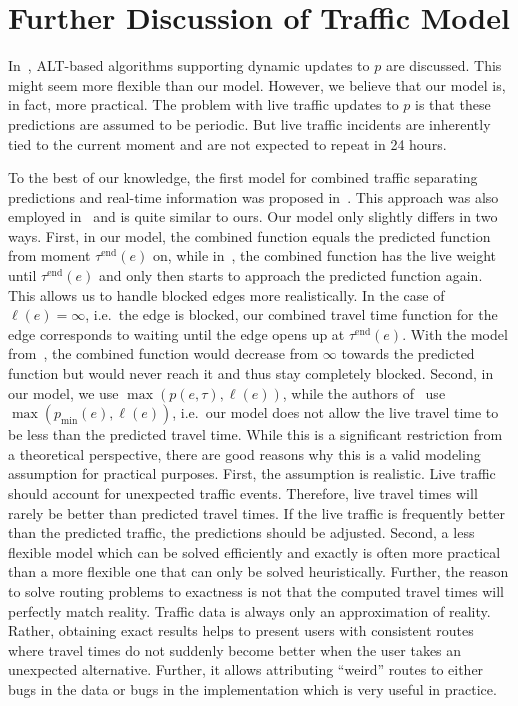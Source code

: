 \documentclass[a4paper,UKenglish,cleveref, autoref, thm-restate]{lipics-v2021}
\newcommand*{\pred}{p}
\newcommand*{\live}{\ell}
\newcommand*{\tend}{\tau^{\operatorname{end}}}
\begin{document}




\appendix

\section{Further Discussion of Traffic Model}\label{sec:appendix:model}

In~\cite{dn-crdtd-12}, ALT-based algorithms supporting dynamic updates to $\pred$ are discussed.
This might seem more flexible than our model.
However, we believe that our model is, in fact, more practical.
The problem with live traffic updates to $\pred$ is that these predictions are assumed to be periodic.
But live traffic incidents are inherently tied to the current moment and are not expected to repeat in 24 hours.

To the best of our knowledge, the first model for combined traffic separating predictions and real-time information was proposed in~\cite{strasser:OASIcs:2017:7897}.
This approach was also employed in~\cite{strasser_et_al:LIPIcs.SEA.2021.6} and is quite similar to ours.
Our model only slightly differs in two ways.
First, in our model, the combined function equals the predicted function from moment $\tend(e)$ on, while in~\cite{strasser:OASIcs:2017:7897}, the combined function has the live weight until $\tend(e)$ and only then starts to approach the predicted function again.
This allows us to handle blocked edges more realistically.
In the case of $\live(e) = \infty$, i.e.\ the edge is blocked, our combined travel time function for the edge corresponds to waiting until the edge opens up at $\tend(e)$.
With the model from~\cite{strasser:OASIcs:2017:7897}, the combined function would decrease from $\infty$ towards the predicted function but would never reach it and thus stay completely blocked.
Second, in our model, we use $\max(\pred(e, \tau), \live(e))$, while the authors of~\cite{strasser:OASIcs:2017:7897} use $\max(\pred_{\min}(e), \live(e))$, i.e.\ our model does not allow the live travel time to be less than the predicted travel time.
While this is a significant restriction from a theoretical perspective, there are good reasons why this is a valid modeling assumption for practical purposes.
First, the assumption is realistic.
Live traffic should account for unexpected traffic events.
Therefore, live travel times will rarely be better than predicted travel times.
If the live traffic is frequently better than the predicted traffic, the predictions should be adjusted.
Second, a less flexible model which can be solved efficiently and exactly is often more practical than a more flexible one that can only be solved heuristically.
Further, the reason to solve routing problems to exactness is not that the computed travel times will perfectly match reality.
Traffic data is always only an approximation of reality.
Rather, obtaining exact results helps to present users with consistent routes where travel times do not suddenly become better when the user takes an unexpected alternative.
Further, it allows attributing ``weird'' routes to either bugs in the data or bugs in the implementation which is very useful in practice.
\end{document}

